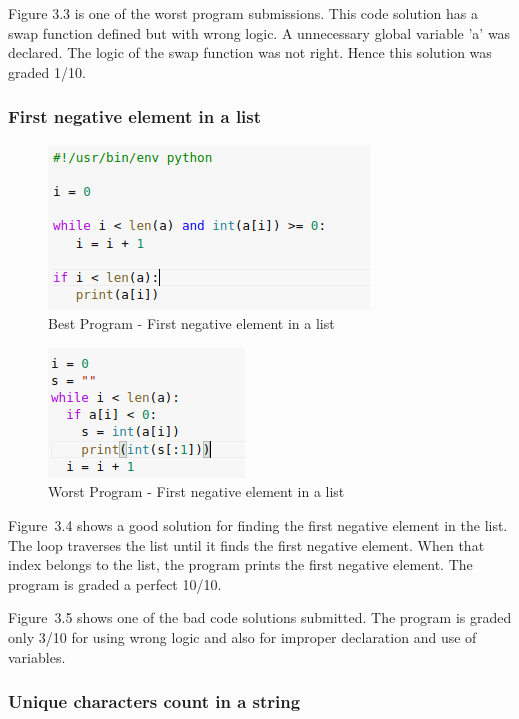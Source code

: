 Figure 3.3 is one of the worst program submissions. This code
solution has a swap function defined but with wrong logic. A
unnecessary global variable 'a' was declared. The logic of
the swap function was not right. Hence this solution was
graded 1/10.

\newpage
\subsubsection{First negative element in a list}

\begin{figure}[h]
\centering
\includegraphics{./figures/best_fn.png}
\caption{Best Program - First negative element in a list}
\label{fig1}
\end{figure}

\begin{figure}[h]
\centering
\includegraphics{./figures/worst_fn.png}
\caption{Worst Program - First negative element in a list}
\label{fig1}
\end{figure}

Figure~3.4 shows a good solution for finding the first
negative element in the list. The loop traverses the list
until it finds the first negative element. When that index
belongs to the list, the program prints the first negative
element. The program is graded a perfect 10/10.

Figure~3.5 shows one of the bad code solutions submitted. The
program is graded only 3/10 for using wrong logic and also
for improper declaration and use of variables.

\newpage

\subsubsection{Unique characters count in a string}

